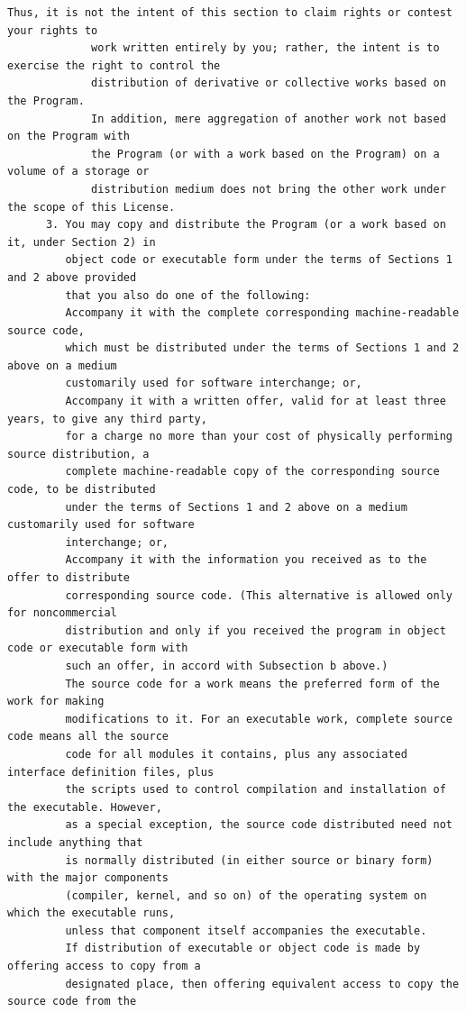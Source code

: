 \begin{lstlisting}[basicstyle=\ttfamily\footnotesize,breaklines=true]
             Thus, it is not the intent of this section to claim rights or contest your rights to
             work written entirely by you; rather, the intent is to exercise the right to control the
             distribution of derivative or collective works based on the Program.
             In addition, mere aggregation of another work not based on the Program with
             the Program (or with a work based on the Program) on a volume of a storage or
             distribution medium does not bring the other work under the scope of this License.
      3. You may copy and distribute the Program (or a work based on it, under Section 2) in
         object code or executable form under the terms of Sections 1 and 2 above provided
         that you also do one of the following:
         Accompany it with the complete corresponding machine-readable source code,
         which must be distributed under the terms of Sections 1 and 2 above on a medium
         customarily used for software interchange; or,
         Accompany it with a written offer, valid for at least three years, to give any third party,
         for a charge no more than your cost of physically performing source distribution, a
         complete machine-readable copy of the corresponding source code, to be distributed
         under the terms of Sections 1 and 2 above on a medium customarily used for software
         interchange; or,
         Accompany it with the information you received as to the offer to distribute
         corresponding source code. (This alternative is allowed only for noncommercial
         distribution and only if you received the program in object code or executable form with
         such an offer, in accord with Subsection b above.)
         The source code for a work means the preferred form of the work for making
         modifications to it. For an executable work, complete source code means all the source
         code for all modules it contains, plus any associated interface definition files, plus
         the scripts used to control compilation and installation of the executable. However,
         as a special exception, the source code distributed need not include anything that
         is normally distributed (in either source or binary form) with the major components
         (compiler, kernel, and so on) of the operating system on which the executable runs,
         unless that component itself accompanies the executable.
         If distribution of executable or object code is made by offering access to copy from a
         designated place, then offering equivalent access to copy the source code from the

\end{lstlisting}
